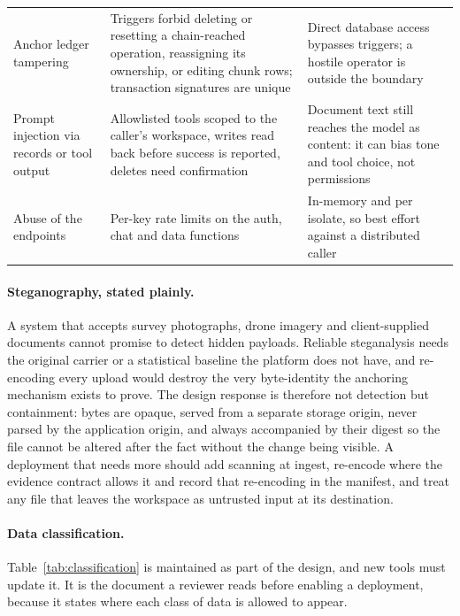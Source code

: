 \documentclass[10pt,a4paper,twocolumn]{article}
\begin{document}
\begin{table}[t]
\begin{tabular}{@{}>{\raggedright\arraybackslash}p{}
  >{\raggedright\arraybackslash}p{}
  >{\raggedright\arraybackslash}p{}@{}}
Anchor ledger tampering &
  Triggers forbid deleting or resetting a chain-reached operation, reassigning its
  ownership, or editing chunk rows; transaction signatures are unique &
  Direct database access bypasses triggers; a hostile operator is outside the
  boundary \\

Prompt injection via records or tool output &
  Allowlisted tools scoped to the caller's workspace, writes read back before
  success is reported, deletes need confirmation &
  Document text still reaches the model as content: it can bias tone and tool
  choice, not permissions \\

Abuse of the endpoints &
  Per-key rate limits on the auth, chat and data functions &
  In-memory and per isolate, so best effort against a distributed caller \\
\bottomrule
\end{tabular}
\end{table}

\paragraph{Steganography, stated plainly.}
A system that accepts survey photographs, drone imagery and client-supplied
documents cannot promise to detect hidden payloads. Reliable steganalysis needs the
original carrier or a statistical baseline the platform does not have, and
re-encoding every upload would destroy the very byte-identity the anchoring mechanism
exists to prove. The design response is therefore not detection but containment:
bytes are opaque, served from a separate storage origin, never parsed by the
application origin, and always accompanied by their digest so the file cannot be
altered after the fact without the change being visible. A deployment that needs more
should add scanning at ingest, re-encode where the evidence contract allows it and
record that re-encoding in the manifest, and treat any file that leaves the workspace
as untrusted input at its destination.

\paragraph{Data classification.}
Table~\ref{tab:classification} is maintained as part of the design, and new tools must
update it. It is the document a reviewer reads before enabling a deployment, because
it states where each class of data is allowed to appear.
\end{document}
